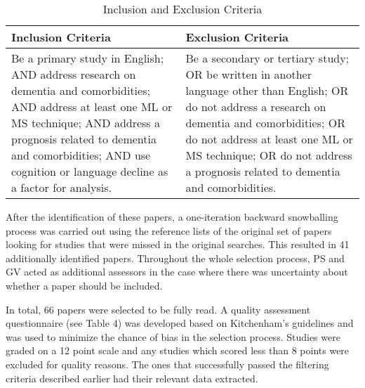 \documentclass[12pt]{article}
\begin{document}
\begin{table}[H]
	\begin{center}
	\begin{tabular}{ | p{6cm} | p{6cm} | }
	\hline
	Inclusion Criteria & Exclusion Criteria \\ \hline
	Be a primary study in English; AND address research on dementia and comorbidities; AND address at least one ML or MS technique; AND address a prognosis related to dementia and comorbidities; AND use cognition or language decline as a factor for analysis. &
	Be a secondary or tertiary study; OR be written in another language other than English; OR do not address a research on dementia and comorbidities; OR do not address at least one ML or MS technique; OR do not address a prognosis related to dementia and comorbidities. \\
	\hline 
	\end{tabular}
	\caption[Table caption text]{Inclusion and Exclusion Criteria}
	\label{table:name}
	\end{center}
\end{table}
 
After the identification of these papers, a one-iteration backward snowballing process was carried out using the reference lists of the original set of papers looking for studies that were missed in the original searches. This resulted in 41 additionally identified papers. Throughout the whole selection process, PS and GV acted as additional assessors in the case where there was uncertainty about whether a paper should be included.
\par 
In total, 66 papers were selected to be fully read. A quality assessment questionnaire (see Table 4) was developed based on Kitchenham's guidelines and was used to minimize the chance of bias in the selection process. Studies were graded on a 12 point scale and any studies which scored less than 8 points were excluded for quality reasons. The ones that successfully passed the filtering criteria described earlier had their relevant data extracted. 
\end{document}
